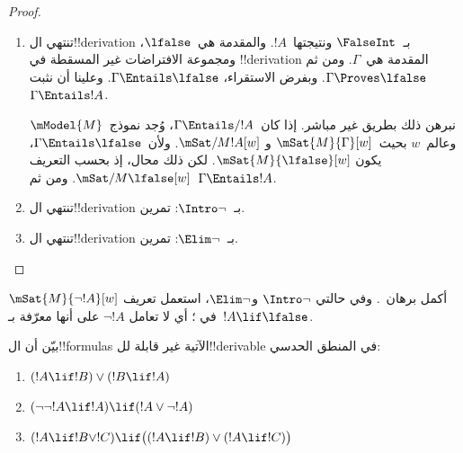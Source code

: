 \documentclass[../../../include/open-logic-section]{subfiles}
\begin{document}
\begin{proof}
\begin{enumerate}
    افترض~$\mSat{M}{\Gamma \cup \Delta}[w]$. ولأن
    $\mSat{M}{\Gamma}[w]$ و$\Gamma \Entails !B \lif !C$، يكون
    $\mSat{M}{!B \lif !C}[w]$. ويعني ذلك بالتعريف أنه لكل~$w'$ بحيث
    $Rww'$، إذا كان~$\mSat{M}{!B}[w']$، كان~$\mSat{M}{!C}[w']$.
    ولأن~$R$ انعكاسية، يكون~$w$ من بين قيم~$w'$ التي تحقق~$Rww'$؛
    أي إذا كان~$\mSat{M}{!B}[w]$، كان~$\mSat{M}{!C}[w]$. ولأن
    $\mSat{M}{\Delta}[w]$ و$\Delta \Entails !B$، يكون
    $\mSat{M}{!B}[w]$. ومن ثم~$\mSat{M}{!C}[w]$، كما أردنا.

  \item تنتهي ال!!{derivation} بـ~$\FalseInt$ ونتيجتها~$!A$.
    والمقدمة هي~$\lfalse$، ومجموعة الافتراضات غير المسقطة في
    !!{derivation} المقدمة هي~$\Gamma$. ومن ثم
    $\Gamma \Proves \lfalse$. وبفرض الاستقراء،
    $\Gamma \Entails \lfalse$. وعلينا أن نثبت
    $\Gamma \Entails !A$.

    نبرهن ذلك بطريق غير مباشر. إذا كان~$\Gamma \Entails/ !A$، وُجد
    نموذج~$\mModel{M}$ وعالم~$w$ بحيث~$\mSat{M}{\Gamma}[w]$ و
    $\mSat/{M}{!A}[w]$. ولأن~$\Gamma \Entails \lfalse$، يكون
    $\mSat{M}{\lfalse}[w]$. لكن ذلك محال، إذ بحسب التعريف
    $\mSat/{M}{\lfalse}[w]$. ومن ثم~$\Gamma \Entails !A$.
  \item تنتهي ال!!{derivation} بـ~$\Intro\lnot$: تمرين.
  \item تنتهي ال!!{derivation} بـ~$\Elim\lnot$: تمرين.
  \end{enumerate}
\end{proof}

\begin{prob}
  أكمل برهان~. وفي حالتي
  $\Intro\lnot$ و$\Elim\lnot$، استعمل تعريف
  $\mSat{M}{\lnot !A}[w]$ في
  ؛ أي لا تعامل
  $\lnot !A$ على أنها معرّفة بـ~$!A \lif \lfalse$.
\end{prob}

\begin{prob}
  بيّن أن ال!!{formula}s الآتية غير قابلة لل!!{derivable} في المنطق
  الحدسي:
  \begin{enumerate}
    \item $(!A \lif !B) \lor (!B \lif !A)$
    \item $(\lnot\lnot !A \lif !A) \lif (!A \lor \lnot !A)$
    \item $(!A \lif !B \lor !C) \lif \bigl((!A \lif !B)\lor(!A \lif !C)\bigr)$
  \end{enumerate}
\end{prob}
\end{document}
